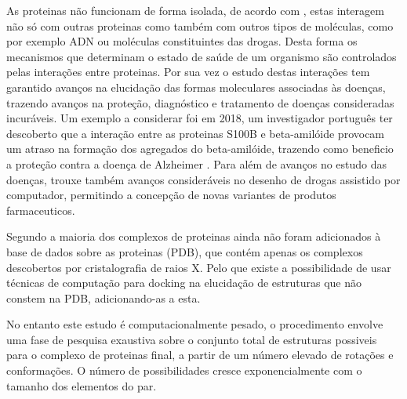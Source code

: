 As proteinas não funcionam de forma isolada, de acordo com \cite{gonzalez2012protein}, estas interagem não só com outras proteinas como também com outros tipos de moléculas, como por exemplo ADN ou moléculas constituintes das drogas. Desta forma os mecanismos que determinam o estado de saúde de um organismo são controlados pelas interações entre proteinas. 
Por sua vez o estudo destas interações tem garantido avanços na elucidação das formas moleculares associadas às doenças, trazendo avanços na proteção, diagnóstico e tratamento de doenças consideradas incuráveis. Um exemplo a considerar foi em 2018, um investigador português ter descoberto que a interação entre as proteinas S100B e beta-amilóide provocam um atraso na formação dos agregados do beta-amilóide, trazendo como beneficio a proteção contra a doença de Alzheimer \cite{noticia}. Para além de avanços no estudo das doenças, trouxe também avanços consideráveis no desenho de drogas assistido por computador, permitindo a concepção de novas variantes de produtos farmaceuticos.\par
Segundo \cite{ZDOCKaccelerating} a maioria dos complexos de proteinas ainda não foram adicionados à base de dados sobre as proteinas (PDB), que contém apenas os complexos descobertos por cristalografia de raios X. Pelo que existe a possibilidade de usar técnicas de computação para docking na elucidação de estruturas que não constem na PDB, adicionando-as a esta.\par
No entanto este estudo é computacionalmente pesado, o procedimento envolve uma fase de pesquisa exaustiva sobre o conjunto total de estruturas possiveis para o complexo de proteinas final, a partir de um número elevado de rotações e conformações. O número de possibilidades cresce exponencialmente com o tamanho dos elementos do par\cite{halperin}. %
